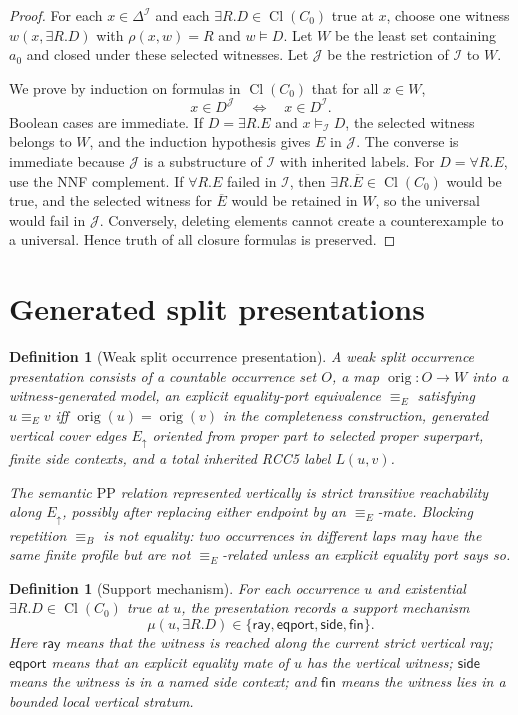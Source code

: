 \documentclass[11pt]{article}
\newtheorem{definition}[theorem]{Definition}
\newcommand{\Cl}{\operatorname{Cl}}
\newcommand{\PP}{\mathrm{PP}}
\newcommand{\I}{\mathcal I}
\newcommand{\J}{\mathcal J}
\newcommand{\Eq}{\equiv_{\!E}}
\newcommand{\Blk}{\equiv_{\!B}}
\newcommand{\orig}{\operatorname{orig}}
\newcommand{\side}{\mathsf{side}}
\newcommand{\fin}{\mathsf{fin}}
\newcommand{\ray}{\mathsf{ray}}
\newcommand{\eport}{\mathsf{eqport}}
\begin{document}
\begin{proof}
For each $x\in\Delta^\I$ and each $\exists R.D\in\Cl(C_0)$ true at $x$, choose one witness $w(x,\exists R.D)$ with $\rho(x,w)=R$ and $w\models D$.  Let $W$ be the least set containing $a_0$ and closed under these selected witnesses.  Let $\J$ be the restriction of $\I$ to $W$.

We prove by induction on formulas in $\Cl(C_0)$ that for all $x\in W$,
\[
   x\in D^\J \quad\Longleftrightarrow\quad x\in D^\I.
\]
Boolean cases are immediate.  If $D=\exists R.E$ and $x\models_\I D$, the selected witness belongs to $W$, and the induction hypothesis gives $E$ in $\J$.  The converse is immediate because $\J$ is a substructure of $\I$ with inherited labels.  For $D=\forall R.E$, use the NNF complement.  If $\forall R.E$ failed in $\I$, then $\exists R.\overline E\in\Cl(C_0)$ would be true, and the selected witness for $\overline E$ would be retained in $W$, so the universal would fail in $\J$.  Conversely, deleting elements cannot create a counterexample to a universal.  Hence truth of all closure formulas is preserved.
\end{proof}

\section{Generated split presentations}

\begin{definition}[Weak split occurrence presentation]
A weak split occurrence presentation consists of a countable occurrence set $O$, a map $\orig:O\to W$ into a witness-generated model, an explicit equality-port equivalence $\Eq$ satisfying $u\Eq v$ iff $\orig(u)=\orig(v)$ in the completeness construction, generated vertical cover edges $E_\uparrow$ oriented from proper part to selected proper superpart, finite side contexts, and a total inherited RCC5 label $L(u,v)$.

The semantic $\PP$ relation represented vertically is strict transitive reachability along $E_\uparrow$, possibly after replacing either endpoint by an $\Eq$-mate.  Blocking repetition $\Blk$ is not equality: two occurrences in different laps may have the same finite profile but are not $\Eq$-related unless an explicit equality port says so.
\end{definition}

\begin{definition}[Support mechanism]
For each occurrence $u$ and existential $\exists R.D\in\Cl(C_0)$ true at $u$, the presentation records a support mechanism
\[
  \mu(u,\exists R.D)\in
  \{\ray,\eport,\side,\fin\}.
\]
Here $\ray$ means that the witness is reached along the current strict vertical ray; $\eport$ means that an explicit equality mate of $u$ has the vertical witness; $\side$ means the witness is in a named side context; and $\fin$ means the witness lies in a bounded local vertical stratum.
\end{definition}
\end{document}
